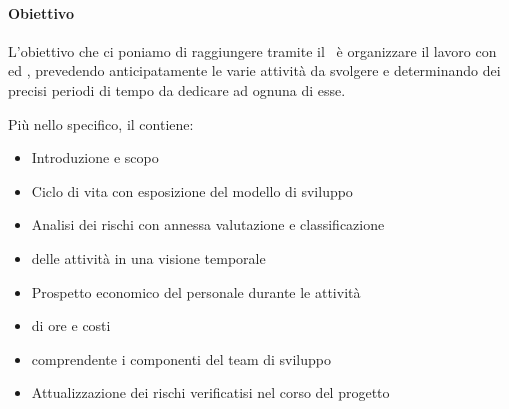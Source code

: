 			\paragraph{Obiettivo}
			L'obiettivo che ci poniamo di raggiungere tramite il \PdP\ è organizzare il lavoro con  ed ,
			prevedendo anticipatamente le varie attività da svolgere e determinando dei precisi periodi di tempo da dedicare ad ognuna di esse.\par
			Più nello specifico, il \Doc{\PdPv} contiene:
			\begin{itemize}
				\item Introduzione e scopo
				\item Ciclo di vita con esposizione del modello di sviluppo
				\item Analisi dei rischi con annessa valutazione e classificazione
				\item {} delle attività in una visione temporale
				\item Prospetto economico del personale durante le attività
				\item {} di ore e costi
				\item {} comprendente i componenti del team di sviluppo
				\item Attualizzazione dei rischi verificatisi nel corso del progetto
			\end{itemize}

